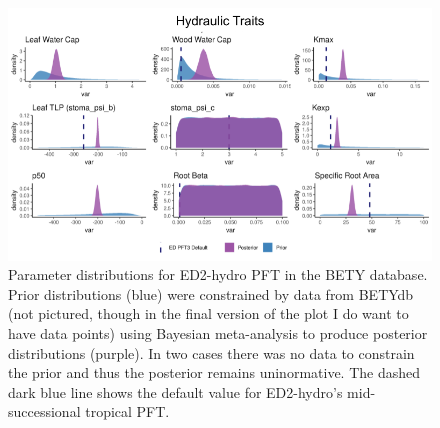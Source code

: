 \begin{figure}[!h]
    \centering
    \includegraphics[width=.95\textwidth]{Hydro_Paper_LaTeX/Hydro_Paper_Figures/hydraulic_traits.png}
    \caption[Hydraulic Traits]{Parameter distributions for ED2-hydro PFT in the BETY database. Prior distributions (blue) were constrained by data from BETYdb (not pictured, though in the final version of the plot I do want to have data points) using Bayesian meta-analysis to produce posterior distributions (purple). In two cases there was no data to constrain the prior and thus the posterior remains uninormative. The dashed dark blue line shows the default value for ED2-hydro's mid-successional tropical PFT.
    }
    \label{fig:hydraulic_traits}
\end{figure}